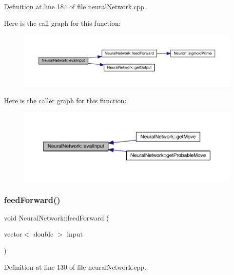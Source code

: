 Definition at line 184 of file neural\+Network.\+cpp.

Here is the call graph for this function\+:\nopagebreak
\begin{figure}[H]
\begin{center}
\leavevmode
\includegraphics[width=350pt]{class_neural_network_a7566cd3df29d6ed6d8134d2c52c1460a_cgraph}
\end{center}
\end{figure}
Here is the caller graph for this function\+:\nopagebreak
\begin{figure}[H]
\begin{center}
\leavevmode
\includegraphics[width=350pt]{class_neural_network_a7566cd3df29d6ed6d8134d2c52c1460a_icgraph}
\end{center}
\end{figure}
\mbox{\label{class_neural_network_a7ebe119117046615958557e820b90c67}} 
\subsubsection{\texorpdfstring{feed\+Forward()}{feedForward()}}
{\footnotesize\ttfamily void Neural\+Network\+::feed\+Forward (\begin{DoxyParamCaption}\item[{vector$<$ double $>$}]{input }\end{DoxyParamCaption})}



Definition at line 130 of file neural\+Network.\+cpp.

